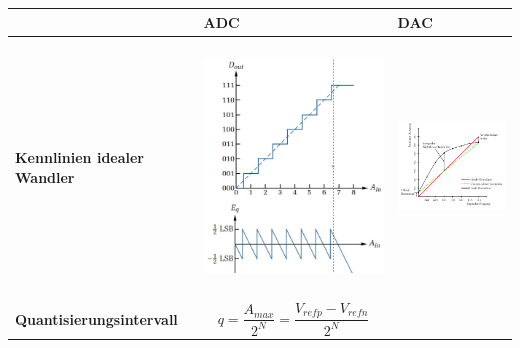 \begin{longtable}[c]{| p{6cm} | p{6cm} | p{6cm} | }
\hline
&
\begin{minipage}{6cm}
\textbf{ADC} 
\end{minipage}
&
\begin{minipage}{6cm}
\textbf{DAC} 
\end{minipage}
\\
\hline
\begin{minipage}{6cm}
\textbf{Kennlinien idealer Wandler}
\end{minipage}
&
\begin{minipage}{6cm}
\begin{center}
    \includegraphics[width=6cm, height = 6cm]{pictures/idealerADC} 
\end{center}
\end{minipage}
&
\begin{minipage}{6cm}
\begin{center}
  \includegraphics[width=6cm]{pictures/idealerDAC}
\end{center}
\end{minipage}
 \\
\hline
\begin{minipage}{6cm}
\textbf{Quantisierungsintervall}
\end{minipage}
&
\begin{equation}
q = \frac{A_{max}}{2^N} = \frac{V_{refp}-V_{refn}}{2^N}
\end{equation}

\end{longtable}
